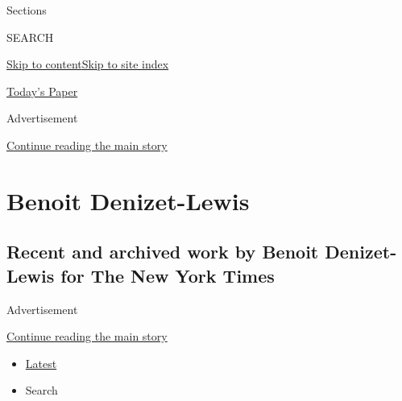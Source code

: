 Sections

SEARCH

\protect\hyperlink{site-content}{Skip to
content}\protect\hyperlink{site-index}{Skip to site index}

\href{https://myaccount.nytimes3xbfgragh.onion/auth/login?response_type=cookie\&client_id=vi}{}

\href{https://www.nytimes3xbfgragh.onion/section/todayspaper}{Today's
Paper}

Advertisement

\protect\hyperlink{after-top}{Continue reading the main story}

\hypertarget{benoit-denizet-lewis}{%
\section{Benoit Denizet-Lewis}\label{benoit-denizet-lewis}}

\hypertarget{recent-and-archived-work-by-benoit-denizet-lewis-for-the-new-york-times}{%
\subsection{Recent and archived work by Benoit Denizet-Lewis for The New
York
Times}\label{recent-and-archived-work-by-benoit-denizet-lewis-for-the-new-york-times}}

Advertisement

\protect\hyperlink{after-mid1}{Continue reading the main story}

\begin{itemize}
\tightlist
\item
  \protect\hyperlink{stream-panel}{Latest}
\item
  Search
\end{itemize}

